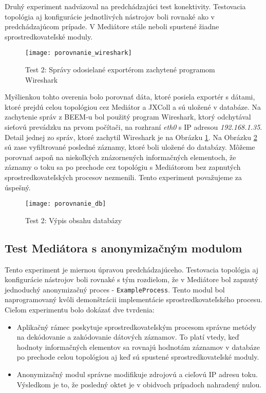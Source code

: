 Druhý experiment nadväzoval na predchádzajúci test konektivity. Testovacia topológia aj konfigurácie 
jednotlivých nástrojov boli rovnaké ako v predchádzajúcom prípade. V Mediátore stále neboli spustené 
žiadne sprostredkovateľské moduly. 

\begin{figure}[ht!]
\centering
\texttt{[image: porovnanie\_wireshark]}
\caption{Test 2: Správy odosielané exportérom zachytené programom Wireshark}\label{o:porovnanie_wireshark}
\end{figure}


Myšlienkou tohto overenia bolo porovnať dáta, ktoré posiela exportér s dátami, ktoré prejdú celou topológiou
cez Mediátor a JXColl a sú uložené v databáze. Na zachytenie správ z BEEM-u bol použitý program 
Wireshark, ktorý odchytával sieťovú prevádzku na prvom počítači, na rozhraní \emph{eth0} s IP adresou 
\emph{192.168.1.35}. Detail jednej zo správ, ktoré zachytil Wireshark je na Obrázku 
\ref{o:porovnanie_wireshark}. Na Obrázku \ref{o:porovnanie_db} sú zase vyfiltrované posledné záznamy, 
ktoré boli uložené do databázy. Môžeme porovnať aspoň na niekoľkých znázornených informačných elementoch,
že záznamy o toku sa po prechode cez topológiu s Mediátorom bez zapnutých sprostredkovateľských procesov 
nezmenili. Tento experiment považujeme za úspešný.

\begin{figure}[ht!]
\centering
\texttt{[image: porovnanie\_db]}
\caption{Test 2: Výpis obsahu databázy}\label{o:porovnanie_db}
\end{figure}


\subsection{Test Mediátora s anonymizačným modulom}

Tento experiment je miernou úpravou predchádzajúceho. Testovacia topológia aj konfigurácie nástrojov boli 
rovnaké s tým rozdielom, že v Mediátore bol zapnutý jednoduchý anonymizačný proces - \verb|ExampleProcess|.
Tento modul bol naprogramovaný kvôli demonštrácii implementácie sprostredkovateľského procesu. Cieľom 
experimentu bolo dokázať dve tvrdenia:
\begin{itemize}
 \item Aplikačný rámec poskytuje sprostredkovateľským procesom správne metódy na dekódovanie a zakódovanie
 dátových záznamov. To platí vtedy, keď hodnoty informačných elementov sa rovnajú hodnotám záznamov
 v databáze po prechode celou topológiou aj keď sú spustené sprostredkovateľské moduly.
 \item Anonymizačný modul správne modifikuje zdrojovú a cieľovú IP adresu toku. Výsledkom je to, že 
 posledný oktet je v obidvoch prípadoch nahradený nulou.
\end{itemize}


